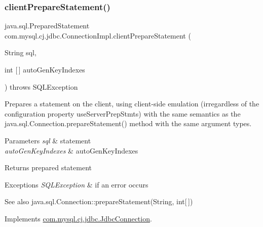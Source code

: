 \subsubsection{\texorpdfstring{client\+Prepare\+Statement()}{clientPrepareStatement()}\hspace{0.1cm}{\footnotesize\ttfamily [5/7]}}
{\footnotesize\ttfamily java.\+sql.\+Prepared\+Statement com.\+mysql.\+cj.\+jdbc.\+Connection\+Impl.\+client\+Prepare\+Statement (\begin{DoxyParamCaption}\item[{String}]{sql,  }\item[{int \mbox{[}$\,$\mbox{]}}]{auto\+Gen\+Key\+Indexes }\end{DoxyParamCaption}) throws S\+Q\+L\+Exception}

Prepares a statement on the client, using client-\/side emulation (irregardless of the configuration property \textquotesingle{}use\+Server\+Prep\+Stmts\textquotesingle{}) with the same semantics as the java.\+sql.\+Connection.\+prepare\+Statement() method with the same argument types.


\begin{DoxyParams}{Parameters}
{\em sql} & statement \\
\hline
{\em auto\+Gen\+Key\+Indexes} & auto\+Gen\+Key\+Indexes \\
\hline
\end{DoxyParams}
\begin{DoxyReturn}{Returns}
prepared statement 
\end{DoxyReturn}

\begin{DoxyExceptions}{Exceptions}
{\em S\+Q\+L\+Exception} & if an error occurs\\
\hline
\end{DoxyExceptions}
\begin{DoxySeeAlso}{See also}
java.\+sql.\+Connection\+::prepare\+Statement(\+String, int\mbox{[}$\,$\mbox{]}) 
\end{DoxySeeAlso}


Implements \mbox{\hyperlink{interfacecom_1_1mysql_1_1cj_1_1jdbc_1_1_jdbc_connection_a11927338ef48e164fdd8444b6b273162}{com.\+mysql.\+cj.\+jdbc.\+Jdbc\+Connection}}.

\mbox{\label{classcom_1_1mysql_1_1cj_1_1jdbc_1_1_connection_impl_ade3184b1d304b0ab3a5a0f5d2f8f0539}} 
